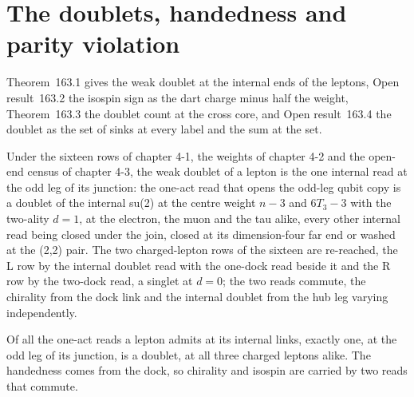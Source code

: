 \section{The doublets, handedness and parity violation}\label{mod:VI-3-doublets-handedness-and-parity-violation}
\label{narr:open:6-3}Theorem~163.1 gives the weak doublet at the internal ends of the leptons, Open result~163.2 the isospin sign as the dart charge minus half the weight, Theorem~163.3 the doublet count at the cross core, and Open result~163.4 the doublet as the set of sinks at every label and the sum at the set.
\begin{chconditional}\label{box:VI-3-doublets-handedness-and-parity-violation:1}
Under the sixteen rows of chapter 4-1, the weights of chapter 4-2 and the open-end census of chapter 4-3, the weak doublet of a lepton is the one internal read at the odd leg of its junction: the one-act read that opens the odd-leg qubit copy is a doublet of the internal su(2) at the centre weight $n - 3$ and $6T_3 - 3$ with the two-ality $d = 1$, at the electron, the muon and the tau alike, every other internal read being closed under the join, closed at its dimension-four far end or washed at the (2,2) pair. The two charged-lepton rows of the sixteen are re-reached, the L row by the internal doublet read with the one-dock read beside it and the R row by the two-dock read, a singlet at $d = 0$; the two reads commute, the chirality from the dock link and the internal doublet from the hub leg varying independently.
\end{chconditional}
Of all the one-act reads a lepton admits at its internal links, exactly one, at the odd leg of its junction, is a doublet, at all three charged leptons alike. The handedness comes from the dock, so chirality and isospin are carried by two reads that commute.
